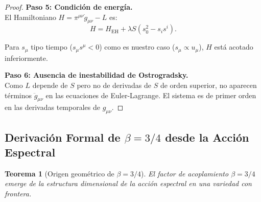 \documentclass[11pt, a4paper]{article}
\theoremstyle{plain}
\newtheorem{teorema}{Teorema}[section]
\theoremstyle{definition}
\begin{document}
\begin{proof}
\textbf{Paso 5: Condición de energía.} \\
El Hamiltoniano $H = \pi^{\mu\nu}\dot{g}_{\mu\nu} - L$ es:
\begin{equation}
H = H_{\text{EH}} + \lambda S (s_0^2 - s_i s^i).
\end{equation}

Para $s_\mu$ tipo tiempo ($s_\mu s^\mu < 0$) como es nuestro caso ($s_\mu \propto u_\mu$), $H$ está acotado inferiormente.

\textbf{Paso 6: Ausencia de inestabilidad de Ostrogradsky.} \\
Como $L$ depende de $S$ pero no de derivadas de $S$ de orden superior, no aparecen términos $\ddot{g}_{\mu\nu}$ en las ecuaciones de Euler-Lagrange. El sistema es de primer orden en las derivadas temporales de $g_{\mu\nu}$.
\end{proof}

\subsection{Derivación Formal de \texorpdfstring{$\beta = 3/4$}{β=3/4} desde la Acción Espectral}
\label{app:beta_derivation}

\begin{teorema}[Origen geométrico de $\beta = 3/4$]
El factor de acoplamiento $\beta = 3/4$ emerge de la estructura dimensional de la acción espectral en una variedad con frontera.
\end{teorema}
\end{document}
